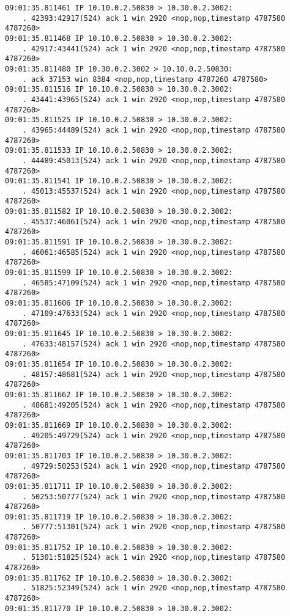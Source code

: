 \documentclass[a4paper,12pt]{article}
\begin{document}
\begin{Verbatim}
09:01:35.811461 IP 10.10.0.2.50830 > 10.30.0.2.3002: 
    . 42393:42917(524) ack 1 win 2920 <nop,nop,timestamp 4787580 4787260>
09:01:35.811468 IP 10.10.0.2.50830 > 10.30.0.2.3002: 
    . 42917:43441(524) ack 1 win 2920 <nop,nop,timestamp 4787580 4787260>
09:01:35.811480 IP 10.30.0.2.3002 > 10.10.0.2.50830: 
    . ack 37153 win 8384 <nop,nop,timestamp 4787260 4787580>
09:01:35.811516 IP 10.10.0.2.50830 > 10.30.0.2.3002: 
    . 43441:43965(524) ack 1 win 2920 <nop,nop,timestamp 4787580 4787260>
09:01:35.811525 IP 10.10.0.2.50830 > 10.30.0.2.3002: 
    . 43965:44489(524) ack 1 win 2920 <nop,nop,timestamp 4787580 4787260>
09:01:35.811533 IP 10.10.0.2.50830 > 10.30.0.2.3002: 
    . 44489:45013(524) ack 1 win 2920 <nop,nop,timestamp 4787580 4787260>
09:01:35.811541 IP 10.10.0.2.50830 > 10.30.0.2.3002: 
    . 45013:45537(524) ack 1 win 2920 <nop,nop,timestamp 4787580 4787260>
09:01:35.811582 IP 10.10.0.2.50830 > 10.30.0.2.3002: 
    . 45537:46061(524) ack 1 win 2920 <nop,nop,timestamp 4787580 4787260>
09:01:35.811591 IP 10.10.0.2.50830 > 10.30.0.2.3002: 
    . 46061:46585(524) ack 1 win 2920 <nop,nop,timestamp 4787580 4787260>
09:01:35.811599 IP 10.10.0.2.50830 > 10.30.0.2.3002: 
    . 46585:47109(524) ack 1 win 2920 <nop,nop,timestamp 4787580 4787260>
09:01:35.811606 IP 10.10.0.2.50830 > 10.30.0.2.3002: 
    . 47109:47633(524) ack 1 win 2920 <nop,nop,timestamp 4787580 4787260>
09:01:35.811645 IP 10.10.0.2.50830 > 10.30.0.2.3002: 
    . 47633:48157(524) ack 1 win 2920 <nop,nop,timestamp 4787580 4787260>
09:01:35.811654 IP 10.10.0.2.50830 > 10.30.0.2.3002: 
    . 48157:48681(524) ack 1 win 2920 <nop,nop,timestamp 4787580 4787260>
09:01:35.811662 IP 10.10.0.2.50830 > 10.30.0.2.3002: 
    . 48681:49205(524) ack 1 win 2920 <nop,nop,timestamp 4787580 4787260>
09:01:35.811669 IP 10.10.0.2.50830 > 10.30.0.2.3002: 
    . 49205:49729(524) ack 1 win 2920 <nop,nop,timestamp 4787580 4787260>
09:01:35.811703 IP 10.10.0.2.50830 > 10.30.0.2.3002: 
    . 49729:50253(524) ack 1 win 2920 <nop,nop,timestamp 4787580 4787260>
09:01:35.811711 IP 10.10.0.2.50830 > 10.30.0.2.3002: 
    . 50253:50777(524) ack 1 win 2920 <nop,nop,timestamp 4787580 4787260>
09:01:35.811719 IP 10.10.0.2.50830 > 10.30.0.2.3002: 
    . 50777:51301(524) ack 1 win 2920 <nop,nop,timestamp 4787580 4787260>
09:01:35.811752 IP 10.10.0.2.50830 > 10.30.0.2.3002: 
    . 51301:51825(524) ack 1 win 2920 <nop,nop,timestamp 4787580 4787260>
09:01:35.811762 IP 10.10.0.2.50830 > 10.30.0.2.3002: 
    . 51825:52349(524) ack 1 win 2920 <nop,nop,timestamp 4787580 4787260>
09:01:35.811770 IP 10.10.0.2.50830 > 10.30.0.2.3002: 

\end{Verbatim}
\end{document}
